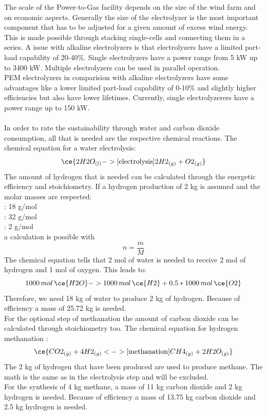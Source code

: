 \begin{parcolumns}[colwidths={1=2.5 cm, 2=10 cm, 3=2.5 cm}]{3}
{The scale of the Power-to-Gas facility depends on the size of the wind farm and on economic aspects. Generally the size of the electrolyzer is the most important component that has to be adjusted for a given amount of excess wind energy. \\
This is made possible through stacking single-cells and connecting them in a series. A issue with alkaline electrolyzers is that electrolyzers have a limited part-load capability of 20-40\%. Single electrolyzers have a power range from 5 kW up to 3400 kW. Multiple electrolyzers can be used in parallel operation. 
\\
PEM electrolyzers in comparision with alkaline electrolyzers have some advantages like a lower limited part-load capability of 0-10\% and slightly higher efficiencies but also have lower lifetimes. Currently, single electrolyzerers have a power range up to 150 kW. 
\\ \\
In order to rate the sustainability through water and carbon dioxide consumption, all that is needed are the respective chemical reactions. The chemical equation for a water electrolysis: \\
\[\ce{2H2O_{(l)}  ->[\text{electrolysis}] 2H2_{(g)} + O2_{(g)}}\]
The amount of hydrogen that is needed can be calculated through the energetic efficiency and stoichiometry.
If a hydrogen production of 2 kg is assumed and the molar masses are respected: \\
 : 18 g/mol \\
 : 32 g/mol \\
 : 2 g/mol \\
a calculation is possible with \[ n = \dfrac{m}{M} \] The chemical equation tells that 2 mol of water is needed to receive 2 mol of hydrogen and 1 mol of oxygen. This leads to:
\[ 1000 \, mol \, \ce{H2O} -> 1000 \,  mol \,  \ce{H2} + 0.5*1000 \, mol \, \ce{O2} \]
Therefore, we need 18 kg of water to produce 2 kg of hydrogen. Because of efficiency a mass of 25.72 kg is needed. \\
For the optional step of methanation the amount of carbon dioxide can be calculated through stoichiometry too.
The chemical equation for hydrogen methanation :
\[\ce{CO2_{(g)} +  4H2_{(g)} <->[\text{methanation}]  CH4_{(g)} + 2H2O_{(g)}}\] 
The 2 kg of hydrogen that have been produced are used to produce methane. The math is the same as in the electrolysis step and will be excluded. \\
For the synthesis of 4 kg methane, a mass of 11 kg carbon dioxide and 2 kg hydrogen is needed. Because of efficiency a mass of 13.75 kg carbon dioxide and 2.5 kg hydrogen is needed.
}
\end{parcolumns}
